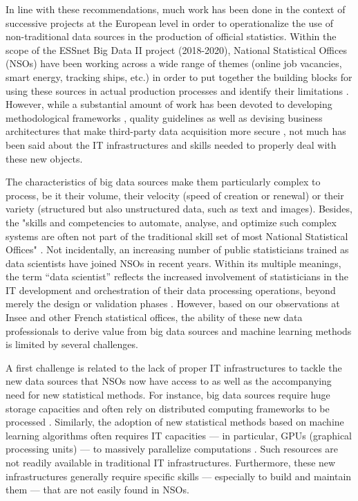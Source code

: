 \documentclass[graybox]{svmult}
\begin{document}
In line with these recommendations, much work has been done in the context of successive projects at the European level in order to operationalize the use of non-traditional data sources in the production of official statistics. Within the scope of the ESSnet Big Data II project (2018-2020), National Statistical Offices (NSOs) have been working across a wide range of themes (online job vacancies, smart energy, tracking ships, etc.) in order to put together the building blocks for using these sources in actual production processes and identify their limitations \cite{essnetbigdata2}. However, while a substantial amount of work has been devoted to developing methodological frameworks \cite{descy2019towards, salgado2020mobile}, quality guidelines \cite{kowarik2022quality} as well as devising business architectures that make third-party data acquisition more secure \cite{ricciato2018processing}, not much has been said about the IT infrastructures and skills needed to properly deal with these new objects.

The characteristics of big data sources make them particularly complex to process, be it their volume, their velocity (speed of creation or renewal) or their variety (structured but also unstructured data, such as text and images). Besides, the "skills and competencies to automate, analyse, and optimize such complex systems are often not part of the traditional skill set of most National Statistical Offices" \cite{ashofteh2021data}. Not incidentally, an increasing number of public statisticians trained as data scientists have joined NSOs in recent years. Within its multiple meanings, the term “data scientist” reflects the increased involvement of statisticians in the IT development and orchestration of their data processing operations, beyond merely the design or validation phases \cite{davenport2012data}. However, based on our observations at Insee and other French statistical offices, the ability of these new data professionals to derive value from big data sources and machine learning methods is limited by several challenges.

A first challenge is related to the lack of proper IT infrastructures to tackle the new data sources that NSOs now have access to as well as the accompanying need for new statistical methods. For instance, big data sources require huge storage capacities and often rely on distributed computing frameworks to be processed \cite{liu2013computing}. Similarly, the adoption of new statistical methods based on machine learning algorithms often requires IT capacities — in particular, GPUs (graphical processing units) — to massively parallelize computations \cite{saiyeda2017cloud}. Such resources are not readily available in traditional IT infrastructures. Furthermore, these new infrastructures generally require specific skills — especially to build and maintain them — that are not easily found in NSOs.
\end{document}
